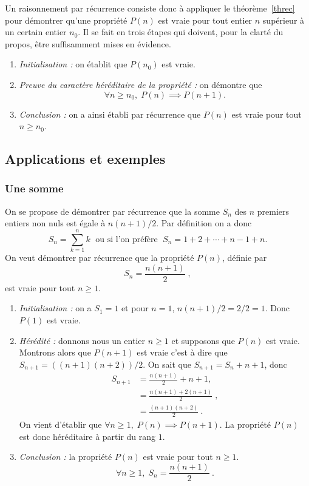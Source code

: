 %
\begin{remark}
Un raisonnement par récurrence consiste donc à appliquer le théorème \ref{threc} pour démontrer qu'une propriété $P(n)$ est vraie pour tout entier $n$ supérieur à un certain entier $n_0$. Il se fait en trois étapes qui doivent, pour la clarté du propos, être suffisamment mises en évidence.
\begin{enumerate}
\item \textit{Initialisation :} on établit que $P(n_0)$ est vraie.
\item \textit{Preuve du caractère héréditaire de la propriété :} on démontre que 
\[
\forall n≥n_0,\; P(n)\implies P(n+1).
\]
\item \textit{Conclusion :} on a ainsi établi par récurrence que $P(n)$ est vraie pour tout $n≥n_0$.
\end{enumerate}
\end{remark}

\subsection{Applications et exemples}

\subsubsection{Une somme}
On se propose de démontrer par récurrence que la somme $S_n$ des $n$ premiers entiers non nuls est égale à $n(n+1)/2$. Par définition on a donc
\[
S_n=\sum_{k=1}^n k\;\text{ ou si l'on préfère }\;  S_n=1+2+\cdots+n-1+n.
\]
On veut démontrer par récurrence que la propriété $P(n)$, définie par 
\[
S_n=\frac{n(n+1)}{2}\;,
\]
est vraie pour tout $n≥1$.
\begin{enumerate}
\item \textit{Initialisation :} on a $S_1=1$ et pour $n=1$, $n(n+1)/2=2/2=1$. Donc $P(1)$ est vraie.
\item \textit{Hérédité :} donnons nous un entier $n≥1$ et supposons que $P(n)$ est vraie. 
Montrons alors que $P(n+1)$ est vraie c'est à dire que $S_{n+1}=((n+1)(n+2))/2$.
On sait que $S_{n+1}=S_{n}+n+1$, donc
\begin{align*}
S_{n+1}&=\frac{n(n+1)}{2}+n+1,\\
&=\frac{n(n+1)+2(n+1)}{2}\;,\\
&=\frac{(n+1)(n+2)}{2}\:.
\end{align*}
On vient d'établir que $\forall n≥1,\;P(n)\implies P(n+1)$. La propriété $P(n)$ est donc héréditaire à partir du rang $1$.
\item \textit{Conclusion :} la propriété $P(n)$ est vraie pour tout $n≥1$.
\[
\forall n≥1,\;S_n=\frac{n(n+1)}{2}\:.
\]
\end{enumerate}

